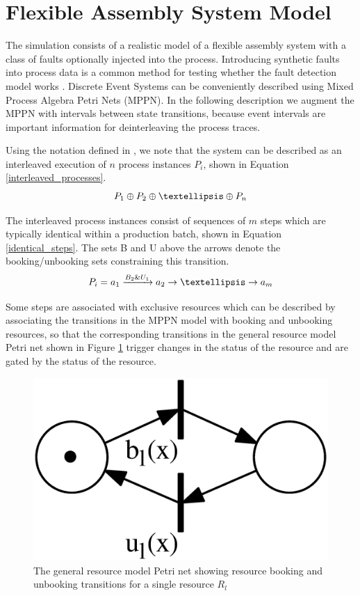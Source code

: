 \documentclass[journal]{IEEEtran}
\begin{document}
\section{Flexible Assembly System Model}

The simulation consists of a realistic model of a flexible assembly system with a class of faults optionally injected into the process.
Introducing synthetic faults into process data is a common method for testing whether the fault detection model works \cite{able2016model}.
Discrete Event Systems can be conveniently
described using Mixed Process Algebra Petri Nets (MPPN)\cite{falkman2001modeling}. In the following description we augment the MPPN with intervals between state transitions,
because event intervals are important information for deinterleaving the process traces.

Using the notation defined in \cite{falkman2001combined}, we note that the system can be described as an interleaved execution of $ n $ process instances $ P_i $, shown in
Equation \ref{interleaved_processes}.
\begin{equation}
 P_1 \oplus P_2 \oplus \textellipsis \oplus P_n
 \label{interleaved_processes}
\end{equation}

The interleaved process instances consist of sequences of $ m $ steps which are typically identical within a production batch, shown in Equation \ref{identical_steps}.
The sets B and U above the arrows denote the booking/unbooking sets constraining this transition.
\begin{equation}
 P_i = a_1 \xrightarrow{B_2 \& U_1} a_2 \rightarrow \textellipsis \rightarrow a_m
 \label{identical_steps}
\end{equation}

Some steps are associated with exclusive resources which can be described by associating the transitions in the MPPN model with booking and unbooking resources, so that
the corresponding transitions in the general resource model Petri net shown in Figure \ref{figure:resource_model} trigger changes in the status of the resource and
are gated by the status of the resource.

\begin{figure}[tb]
 \centering
 \includegraphics[width=8 cm,keepaspectratio=true]{./general_resource_model.eps}
 \caption{The general resource model Petri net showing resource booking and unbooking transitions for a single resource $ R_l $}
 \label{figure:resource_model}
\end{figure}
\end{document}

